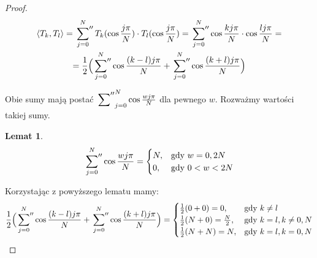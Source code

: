 \documentclass{article}
\newtheorem{lemma}{Lemat}
\newcommand{\sumbis}[3] {
	\sideset{}{''}\sum_{#1}^{#2} #3
}
\newcommand{\dotproduct}[2] {
	\langle #1 , #2 \rangle
}
\begin{document}
\begin{proof}
	\begin{gather*}
	\dotproduct{T_k}{T_l} = \sumbis{j=0}{N}{ T_k( \cos{ \frac{ j \pi}{N} } ) \cdot T_l( \cos{ \frac{j \pi}{N} } ) } = \sumbis{j=0}{N}{ \cos{ \frac{ k j \pi  }{ N } } \cdot \cos{ \frac{l j \pi}{N} } } = \\
	= \frac{1}{2} \Big( \sumbis{j=0}{N}{ \cos{ \frac{ (k-l) j \pi }{ N } } }+ 
	  \sumbis{j=0}{N}{ \cos{ \frac{ (k+l) j \pi }{ N } } } \Big)
	\end{gather*}
	
	Obie sumy mają postać $ \sumbis{j=0}{N}{ \cos{ \frac{ w j \pi }{ N } } } $ dla pewnego $w$. Rozważmy wartości takiej sumy.
	
	\begin{lemma}
		\begin{equation}
		\sumbis{j=0}{N}{ \cos{ \frac{ w j \pi}{N} } } = 
		\begin{cases}
			N, & \text{gdy $w =0, 2N$}\\
			0, & \text{gdy $0 < w < 2N$}
		\end{cases}
		\end{equation}
	\end{lemma}
	
	Korzystając z powyższego lematu mamy:
	\begin{gather*} 
	\frac{1}{2} \Big( \sumbis{j=0}{N}{ \cos{ \frac{ (k-l) j \pi}{N} } } + \sumbis{j=0}{N}{ \cos{ \frac{ (k+l) j \pi}{N} } } \Big) = 
		\begin{cases}
			\frac{1}{2}(0 + 0) = 0, & \text{gdy $ k \neq l$}\\
			\frac{1}{2}(N + 0) = \frac{N}{2}, & \text{gdy $ k = l, k \neq 0, N$}\\
			\frac{1}{2}(N + N) = N, & \text{gdy $k = l, k=0, N$}
		\end{cases}
	\end{gather*}
\end{proof}
\end{document}
